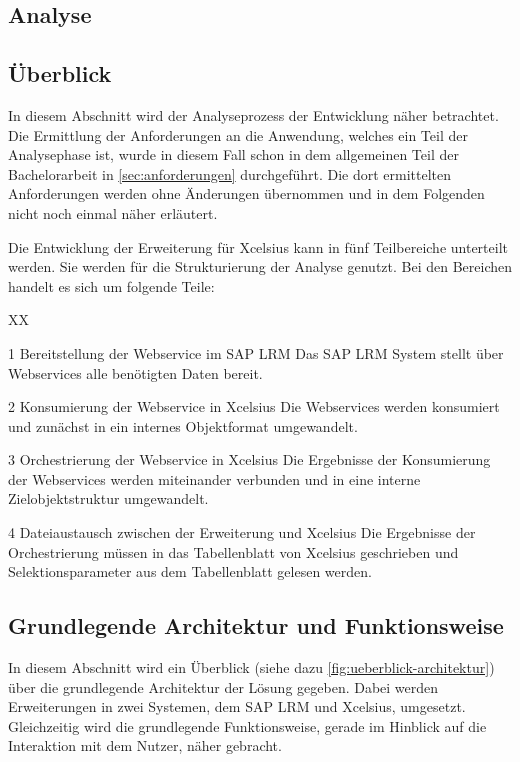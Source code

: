 \begin{onehalfspacing}
\section{Analyse}

\subsection{Überblick}
In diesem Abschnitt wird der Analyseprozess der Entwicklung näher betrachtet. Die Ermittlung der Anforderungen an die Anwendung, welches ein Teil der Analysephase ist, wurde in diesem Fall schon in dem allgemeinen Teil der Bachelorarbeit in \vref{sec:anforderungen} durchgeführt. Die dort ermittelten Anforderungen werden ohne Änderungen übernommen und in dem Folgenden nicht noch einmal näher erläutert.

Die Entwicklung der Erweiterung für \gls{Xcelsius} kann in fünf Teilbereiche unterteilt werden. Sie werden für die Strukturierung der Analyse genutzt. Bei den Bereichen handelt es sich um folgende Teile:


\begin{seToplist} { XX }
\item[1] Bereitstellung der Webservice im SAP LRM \newline
Das SAP LRM System stellt über Webservices alle benötigten Daten bereit.

\item[2] Konsumierung der Webservice in \gls{Xcelsius} \newline
Die Webservices werden konsumiert und zunächst in ein internes Objektformat umgewandelt.

\item[3] Orchestrierung der Webservice in \gls{Xcelsius} \newline
Die Ergebnisse der Konsumierung der Webservices werden miteinander verbunden und in eine interne Zielobjektstruktur umgewandelt.

\item[4] Dateiaustausch zwischen der Erweiterung und \gls{Xcelsius} \newline
Die Ergebnisse der Orchestrierung müssen in das Tabellenblatt von \gls{Xcelsius} geschrieben und Selektionsparameter aus dem Tabellenblatt gelesen werden.

\end{seToplist}

\subsection{Grundlegende Architektur und Funktionsweise}
In diesem Abschnitt wird ein Überblick (siehe dazu \vref{fig:ueberblick-architektur}) über die grundlegende Architektur der Lösung gegeben. Dabei werden Erweiterungen in zwei Systemen, dem SAP LRM und \gls{Xcelsius}, umgesetzt. Gleichzeitig wird die grundlegende Funktionsweise, gerade im Hinblick auf die Interaktion mit dem Nutzer, näher gebracht.


\end{onehalfspacing}

